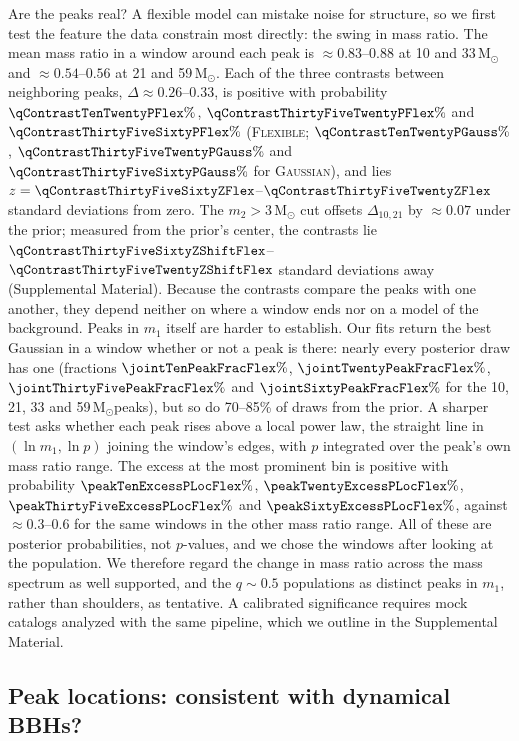 \documentclass[%
 reprint,
 amsmath,amssymb,
 aps,
 prl,
 nofootinbib,nobibnotes,
 floatfix,
]{revtex4-2}
\newcommand{\Msun}{\ensuremath{\mathrm{M}_{\odot}}}
\newcommand{\flexiblespins}{\textsc{Flexible}\xspace}
\newcommand{\gaussianspins}{\textsc{Gaussian}\xspace}
\newcommand{\featTen}{10\xspace}
\newcommand{\featTwenty}{21\xspace}
\newcommand{\featThirtyFive}{33\xspace}
\newcommand{\featSixty}{59\xspace}
\begin{document}
Are the peaks real? A flexible model can mistake noise for structure, so we first test the feature the data constrain most directly: the swing in mass ratio. The mean mass ratio in a window around each peak is $\approx 0.83$--$0.88$ at \featTen and \featThirtyFive\,\Msun and $\approx 0.54$--$0.56$ at \featTwenty and \featSixty\,\Msun. Each of the three contrasts between neighboring peaks, $\Delta \approx 0.26$--$0.33$, is positive with probability $\qContrastTenTwentyPFlex\%$, $\qContrastThirtyFiveTwentyPFlex\%$ and $\qContrastThirtyFiveSixtyPFlex\%$ (\flexiblespins; $\qContrastTenTwentyPGauss\%$, $\qContrastThirtyFiveTwentyPGauss\%$ and $\qContrastThirtyFiveSixtyPGauss\%$ for \gaussianspins), and lies $z = \qContrastThirtyFiveSixtyZFlex$--$\qContrastThirtyFiveTwentyZFlex$ standard deviations from zero. The $m_2 > 3\,\Msun$ cut offsets $\Delta_{\featTen,\featTwenty}$ by $\approx 0.07$ under the prior; measured from the prior's center, the contrasts lie $\qContrastThirtyFiveSixtyZShiftFlex$--$\qContrastThirtyFiveTwentyZShiftFlex$ standard deviations away (Supplemental Material). Because the contrasts compare the peaks with one another, they depend neither on where a window ends nor on a model of the background. Peaks in $m_1$ itself are harder to establish. Our fits return the best Gaussian in a window whether or not a peak is there: nearly every posterior draw has one (fractions $\jointTenPeakFracFlex\%$, $\jointTwentyPeakFracFlex\%$, $\jointThirtyFivePeakFracFlex\%$ and $\jointSixtyPeakFracFlex\%$ for the \featTen, \featTwenty, \featThirtyFive and \featSixty\,\Msun peaks), but so do 70--85\% of draws from the prior. A sharper test asks whether each peak rises above a local power law, the straight line in $(\ln m_1, \ln p)$ joining the window's edges, with $p$ integrated over the peak's own mass ratio range. The excess at the most prominent bin is positive with probability $\peakTenExcessPLocFlex\%$, $\peakTwentyExcessPLocFlex\%$, $\peakThirtyFiveExcessPLocFlex\%$ and $\peakSixtyExcessPLocFlex\%$, against $\approx 0.3$--$0.6$ for the same windows in the other mass ratio range. All of these are posterior probabilities, not $p$-values, and we chose the windows after looking at the population. We therefore regard the change in mass ratio across the mass spectrum as well supported, and the $q \sim 0.5$ populations as distinct peaks in $m_1$, rather than shoulders, as tentative. A calibrated significance requires mock catalogs analyzed with the same pipeline, which we outline in the Supplemental Material.

\subsection{Peak locations: consistent with dynamical \acp{BBH}?}
\end{document}
